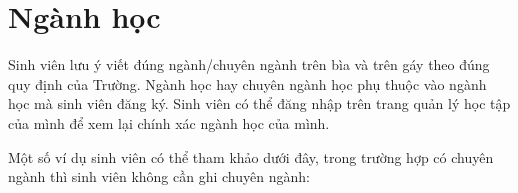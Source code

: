\documentclass[../DoAn.tex]{subfiles}
\begin{document}
\section{Ngành học}
Sinh viên lưu ý viết đúng ngành/chuyên ngành trên bìa và trên gáy theo đúng quy định của Trường. Ngành học hay chuyên ngành học phụ thuộc vào ngành học mà sinh viên đăng ký. Sinh viên có thể đăng nhập trên trang quản lý học tập của mình để xem lại chính xác ngành học của mình. 

Một số ví dụ sinh viên có thể tham khảo dưới đây, trong trường hợp có chuyên ngành thì sinh viên không cần ghi chuyên ngành:

\end{document}
